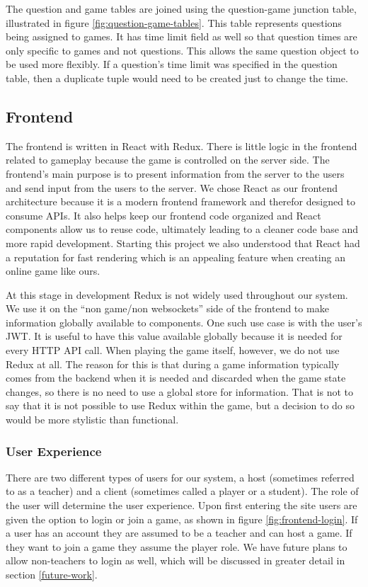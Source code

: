 \documentclass{article}
\begin{document}
    		The question and game tables are joined using the question-game junction table, illustrated in figure \ref{fig:question-game-tables}. This table represents questions being assigned to games. It has time limit field as well so that question times are only specific to games and not questions. This allows the same question object to be used more flexibly. If a question's time limit was specified in the question table, then a duplicate tuple would need to be created just to change the time.

	\subsection{Frontend}
	    The frontend is written in React with Redux. There is little logic in the frontend related to gameplay because the game is controlled on the server side. The frontend's main purpose is to present information from the server to the users and send input from the users to the server. We chose React as our frontend architecture because it is a modern frontend framework and therefor designed to consume APIs. It also helps keep our frontend code organized and React components allow us to reuse code, ultimately leading to a cleaner code base and more rapid development. Starting this project we also understood that React had a reputation for fast rendering which is an appealing feature when creating an online game like ours.
	    \smallskip
	    
	    At this stage in development Redux is not widely used throughout our system. We use it on the ``non game/non websockets'' side of the frontend to make information globally available to components. One such use case is with the user's JWT. It is useful to have this value available globally because it is needed for every HTTP API call. When playing the game itself, however, we do not use Redux at all. The reason for this is that during a game information typically comes from the backend when it is needed and discarded when the game state changes, so there is no need to use a global store for information. That is not to say that it is not possible to use Redux within the game, but a decision to do so would be more stylistic than functional.
	    
	    \subsubsection{User Experience}
	        There are two different types of users for our system, a host (sometimes referred to as a teacher) and a client (sometimes called a player or a student). The role of the user will determine the user experience. Upon first entering the site users are given the option to login or join a game, as shown in figure \ref{fig:frontend-login}. If a user has an account they are assumed to be a teacher and can host a game. If they want to join a game they assume the player role. We have future plans to allow non-teachers to login as well, which will be discussed in greater detail in section \ref{future-work}.
	        
\end{document}
